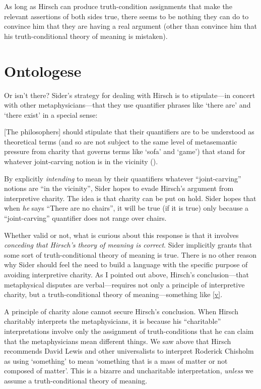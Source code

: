 \documentclass[11pt]{article}
\newenvironment{squote}{%
\begin{spacing}{1}
       	\begin{list}{}{%
\setlength{\labelwidth}{0pt}%
\rightmargin\leftmargin%
}
\item\relax
}{%
\end{list}%
\end{spacing}
}
\begin{document}
\begin{spacing}{1.25}
As long as Hirsch can produce truth-condition assignments that make
the relevant assertions of both sides true, there seems to be nothing
they can do to convince him that they are having a real argument
(other than convince him that his truth-conditional theory of meaning
is mistaken).

\section{Ontologese}
\label{ontologese}
Or isn't there?  Sider's strategy for dealing with Hirsch is to
stipulate---in concert with other metaphysicians---that they use
quantifier phrases like `there are' and `there exist' in a special
sense:

\begin{squote}
{[}The philosophers{]} should stipulate that their quantifiers are to be
understood as theoretical terms (and so are not subject to the same
level of metasemantic pressure from charity that governs terms like
`sofa' and `game') that stand for whatever joint-carving notion is in
the vicinity (\citeyear[9]{sider2011b}).
\end{squote}

By explicitly \emph{intending} to mean by their quantifiers whatever
``joint-carving'' notions are ``in the vicinity'', Sider hopes to
evade Hirsch's argument from interpretive charity.  The idea is that
charity can be put on hold.  Sider hopes that when {\em he} says
``There are no chairs'', it will be true (if it is true) only because
a ``joint-carving'' quantifier does not range over chairs.

Whether valid or not, what is curious about this response is that it
involves {\em conceding that Hirsch's theory of meaning is correct}.
Sider implicitly grants that some sort of truth-conditional theory of
meaning is true.  There is no other reason why Sider should feel the
need to build a language with the specific purpose of avoiding
interpretive charity.  As I pointed out above, Hirsch's
conclusion---that metaphysical disputes are verbal---requires not only
a principle of interpretive charity, but a truth-conditional theory of
meaning---something like \ref{v}.

A principle of charity alone cannot secure Hirsch's conclusion.  When
Hirsch charitably interprets the metaphysicians, it is because his
``charitable'' interpretations involve only the assignment of
truth-conditions that he can claim that the metaphysicians mean
different things.  We saw above that Hirsch recommends David Lewis and
other universalists to interpret Roderick Chisholm as using
`something' to mean `something that is a mass of matter or not
composed of matter'.  This is a bizarre and uncharitable
interpretation, {\em unless} we assume a truth-conditional theory of
meaning.


\end{spacing}
\end{document}
